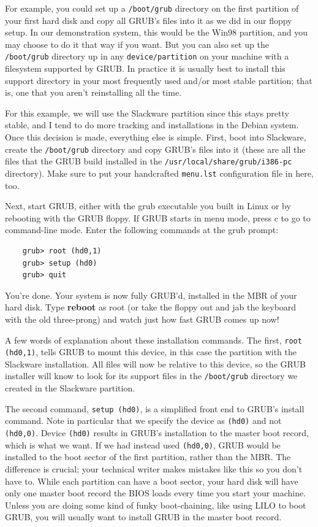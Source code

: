 \documentclass{article}
\begin{document}
For example, you could set up a \texttt{/boot/grub} directory on the first partition of your first hard disk and copy all GRUB's files into it as we did in our floppy setup. In our demonstration system, this would be the Win98 partition, and you may choose to do it that way if you want.
But you can also set up the \texttt{/boot/grub} directory up in any \texttt{device/partition}
on your machine with a filesystem supported by GRUB.
In practice it is usually best to install this support directory in your most frequently used and/or most stable partition; that is, one that you aren't reinstalling all the time.

For this example, we will use the Slackware partition since this stays pretty stable,
and I tend to do more tracking and installations in the Debian system. 
Once this decision is made, everything else is simple.
First, boot into Slackware, create the \texttt{/boot/grub} directory
and copy GRUB's files into it
(these are all the files that the GRUB build installed
in the \texttt{/usr/local/share/grub/i386-pc} directory).
Make sure to put your handcrafted \texttt{menu.lst} configuration file in here, too.

Next, start GRUB, either with the grub executable you built in Linux or by rebooting with the GRUB floppy. If GRUB starts in menu mode, press c to go to command-line mode. Enter the following commands at the grub prompt:

\begin{verbatim}
    grub> root (hd0,1)
    grub> setup (hd0)
    grub> quit
\end{verbatim}

You're done. Your system is now fully GRUB'd, installed in the MBR of your hard disk. Type \textbf{reboot} as root (or take the floppy out and jab the keyboard with the old three-prong) and watch just how fast GRUB comes up now!

A few words of explanation about these installation commands.
The first, \texttt{root (hd0,1)},
tells GRUB to mount this device,
in this case the partition with the Slackware installation.
All files will now be relative to this device,
so the GRUB installer will know to look for its support files
in the \texttt{\texttt{/boot/grub}} directory we created in the Slackware partition.

The second command, \texttt{setup (hd0)}, is a simplified front end to GRUB's install command. Note in particular that we specify the device as \texttt{(hd0)} and not \texttt{(hd0,0)}. Device \texttt{(hd0)} results in GRUB's installation to the master boot record, which is what we want. If we had instead used \texttt{(hd0,0)}, GRUB would be installed to the boot sector of the first partition, rather than the MBR. The difference is crucial; your technical writer makes mistakes like this so you don't have to. While each partition can have a boot sector, your hard disk will have only one master boot record the BIOS loads every time you start your machine. Unless you are doing some kind of funky boot-chaining, like using LILO to boot GRUB, you will usually want to install GRUB in the master boot record.
\end{document}
